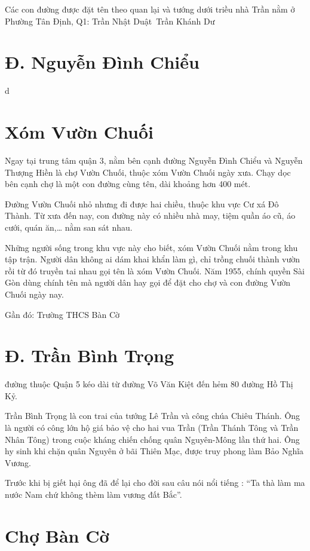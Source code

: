 Các con đường được đặt tên theo quan lại và tướng dưới triều nhà Trần nằm ở Phường Tân Định, Q1:
Trần Nhật Duật\
Trần Khánh Dư

\section{Đ. Nguyễn Đình Chiểu}

d

\section{Xóm Vườn Chuối}

Ngay tại trung tâm quận 3, nằm bên cạnh đường Nguyễn Đình Chiểu và Nguyễn Thượng Hiền là chợ Vườn Chuối, thuộc xóm Vườn Chuối ngày xưa. Chạy dọc bên cạnh chợ là một con đường cùng tên, dài khoảng hơn 400 mét.

Đường Vườn Chuối nhỏ nhưng đi được hai chiều, thuộc khu vực Cư xá Đô Thành. Từ xưa đến nay, con đường này có nhiều nhà may, tiệm quần áo cũ, áo cưới, quán ăn,… nằm san sát nhau.

Những người sống trong khu vực này cho biết, xóm Vườn Chuối nằm trong khu tập trận. Người dân không ai dám khai khẩn làm gì, chỉ trồng chuối thành vườn rồi từ đó truyền tai nhau gọi tên là xóm Vườn Chuối. Năm 1955, chính quyền Sài Gòn dùng chính tên mà người dân hay gọi để đặt cho chợ và con đường Vườn Chuối ngày nay.

Gần đó: Trường THCS Bàn Cờ

\section{Đ. Trần Bình Trọng}

đường thuộc Quận 5 kéo dài từ đường Võ Văn Kiệt đến hẻm 80 đường Hồ Thị Kỷ.

Trần Bình Trọng là con trai của tướng Lê Trần và công chúa Chiêu Thánh. Ông là người có công lớn hộ giá bảo vệ cho hai vua Trần (Trần Thánh Tông và Trần Nhân Tông) trong cuộc kháng chiến chống quân Nguyên-Mông lần thứ hai. Ông hy sinh khi chặn quân Nguyên ở bãi Thiên Mạc, được truy phong làm Bảo Nghĩa Vương.

Trước khi bị giết hại ông đã để lại cho đời sau câu nói nổi tiếng : “Ta thà làm ma nước Nam chứ không thèm làm vương đất Bắc”.

\section{Chợ Bàn Cờ}

